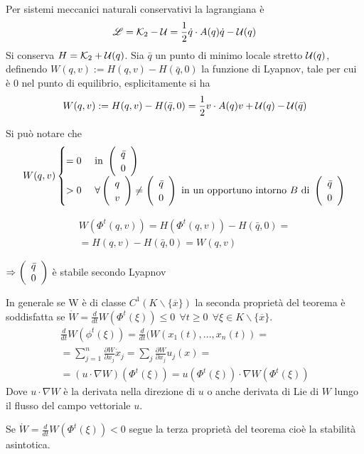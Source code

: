 \documentclass[Main.tex]{subfiles}
\begin{document}
Per sistemi meccanici naturali conservativi la lagrangiana è
\begin{gather}
	\L = \K_2 - \U = \frac{1}{2} \dot q \cdot A(q) \dot q - \U(q)
\end{gather}
Si conserva $H= \K_2 + \U(q)$. Sia $\bar q$ un punto di minimo locale stretto $\U(q)$, definendo $W(q,v):=H(q,v)- H(\bar q, 0)$ la funzione di Lyapnov, tale per cui è 0 nel punto di equilibrio, esplicitamente si ha
\begin{gather}
	W(q,v):=H(q,v)- H(\bar q, 0) = \frac{1}{2} v \cdot A(q) v + \U(q) - \U(\bar q)
\end{gather}

\newpage
\begin{osservazioni}
	\item Si può notare che
	\begin{equation*}
	W(q,v)\begin{cases}
		=0 	\ &\text{in } \vec{\bar q \\ 0} \\
		>0 \ &\forall \vec{q \\v} \neq \vec{ \bar q \\ 0} \ \text{in un opportuno intorno $B$ di} \ \vec{\bar q \\ 0}
	\end{cases}
\end{equation*}

\item 
\begin{gather}
	W( \Phi^t (q,v)) = H( \Phi^t (q,v)) - H(\bar q,0)=\\
	=H(q,v) - H(\bar q,0) = W(q,v)
\end{gather}

$\Rightarrow \vec{\bar q \\ 0}$ è stabile secondo Lyapnov

\item In generale se W è di classe $C^1(K \backslash \{ \overline x \})$ la seconda proprietà del teorema è soddisfatta se 
$\dot W = \frac{d}{dt}W (\Phi^t (\xi)) \leq 0 \ \ \forall t \geq 0 \ \ \forall \xi \in K \backslash \{ \overline x \}$.
\begin{gather}
	\frac{d}{dt}W ( \phi ^t (\xi ))= \frac{d}{dt}( W (x_1 (t),...,x_n(t))=\\
	= \sum_{j=1}^n \frac{ \partial W}{\partial x_j} \dot x_j = \sum_j \frac{ \partial W}{\partial x_j} u_j (x)=\\
	= (u \cdot \nabla W)(\Phi^t (\xi))= u (\Phi ^t (\xi)) \cdot \nabla W (\Phi ^ t(\xi))
\end{gather}
Dove $u \cdot \nabla W$ è la derivata nella direzione di $u$  o anche derivata di Lie di $W$ lungo il flusso del campo vettoriale $u$.

Se $\dot W = \frac{d}{dt}W (\Phi^t (\xi)) < 0$ segue la terza proprietà del teorema cioè la stabilità asintotica.

\end{osservazioni}
\end{document}

